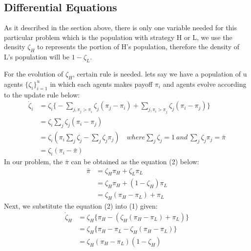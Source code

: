 \documentclass[a4paper, 12pt]{article}
\begin{document}
\subsection{Differential Equations}
As it described in the section above, there is only one variable needed for this particular problem which is the population with strategy H or L, we use the density $\zeta_{H}$ to represents the portion of H's population, therefore the density of L's population will be $1-\zeta_{L}$.
\par For the evolution of $\zeta_{H}$, certain rule is needed. lets say we have a population of u agents $\{\zeta_{i}\}_{i=1}^{u}$ in which each agents makes payoff $\pi_{i}$ and agents evolve according to the update rule below:
\vspace{-3mm}
\begin{equation}
\begin{split}
	\dot\zeta_{i} & = \zeta_{i} \Big\{-\sum_{j,\pi_{j}>\pi_{i}^{}}\zeta_{j}(\pi_{j}-\pi_{i}) + \sum_{j,\pi_{i}>\pi_{j}^{}}\zeta_{j}(\pi_{i}-\pi_{j}) \Big\} \\
	& = \zeta_{i}\sum_{j}\zeta_{j}(\pi_{i}-\pi_{j}) \\
	& = \zeta_{i}(\pi_{i}\sum_{j}\zeta_{j} - \sum_{j}\zeta_{j}\pi_{j}) \quad where \sum_{j}\zeta_{j}=1\ and\ \sum_{j}\zeta_{j}\pi_{j}=\bar{\pi} \\
	& = \zeta_{i}(\pi_{i} - \bar{\pi})
\end{split}
\end{equation}
In our problem, the $\bar{\pi}$ can be obtained as the equation (2) below:
\vspace{-3mm}
\begin{equation}
\begin{split}
	\bar{\pi} & = \zeta_{H}\pi_{H}+ \zeta_{L}\pi_{L} \\
	& = \zeta_{H}\pi_{H}+ (1 - \zeta_{H})\pi_{L} \\
	& = \zeta_{H}(\pi_{H}-\pi_{L})+\pi_{L}
\end{split}		
\end{equation}
Next, we substitute the equation (2) into (1) given:
\vspace{-3mm}
\begin{equation}
\begin{split}
	\dot\zeta_{H} & = \zeta_{H}\{\pi_{H} - (\zeta_{H}(\pi_{H}-\pi_{L})+\pi_{L})\} \\
	& = \zeta_{H}\{\pi_{H}-\pi_{L}-\zeta_{H}(\pi_{H}-\pi_{L}) \} \\
	& = \zeta_{H}(\pi_{H}-\pi_{L})(1-\zeta_{H})
\end{split}
\end{equation}
\end{document}
